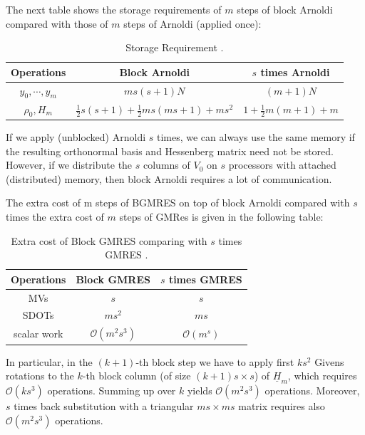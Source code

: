 The next table shows the storage requirements of $m$ steps of block Arnoldi compared with those of $m$ steps of Arnoldi (applied once):

\begin{table}[htbp]
	\renewcommand{\arraystretch}{1.4}
	\small	
	\caption{Storage Requirement \cite{gutknecht2006block}.}
	\label{block-arnoldi-memory}
	\centering
	\begin{tabular}{c|c|c}
		\toprule
		\cellcolor{gray!50}Operations & \cellcolor{gray!50}Block Arnoldi & \cellcolor{gray!50}$s$ times Arnoldi  \\
		\midrule
		$y_0,\cdots,  y_m$ & $ms(s+1)N$ & $(m+1)N$   \\
		\cellcolor{gray!20}$\rho_0,H_m$ & \cellcolor{gray!20}$\frac{1}{2}s(s+1)+\frac{1}{2}ms(ms+1)+ms^2$ & \cellcolor{gray!20}$1+\frac{1}{2}m(m+1)+m$ \\
		\bottomrule
	\end{tabular}
\end{table}

If we apply (unblocked) Arnoldi $s$ times, we can always use the same memory if the resulting orthonormal basis and Hessenberg matrix need not be stored. However, if we distribute the $s$ columns of $V_0$ on $s$ processors with attached (distributed) memory, then block Arnoldi requires a lot of communication.

The extra cost of m steps of BGMRES on top of block Arnoldi compared with $s$ times the extra cost of $m$ steps of GMRes is given in the following table:

\begin{table}[htbp]
	\renewcommand{\arraystretch}{1.4}
	\small	
	\caption{Extra cost of Block GMRES comparing with $s$ times GMRES \cite{gutknecht2006block}.}
	\label{block-gmres-extra}
	\centering
	\begin{tabular}{c|c|c}
		\toprule
		\cellcolor{gray!50}Operations & \cellcolor{gray!50}Block GMRES & \cellcolor{gray!50}$s$ times GMRES  \\
		\midrule
		MVs  & $s$ & $s$ \\
		\cellcolor{gray!20}SDOTs & \cellcolor{gray!20}$ms^2$ & \cellcolor{gray!20}$ms$   \\
		scalar work & $\mathcal{O}(m^2s^3)$ & $\mathcal{O}(m^s)$ \\
		\bottomrule
	\end{tabular}
\end{table}

In particular, in the $(k+1)$-th block step we have to apply first $ks^2$ Givens rotations to the $k$-th block column (of size $(k+1)s\times s$) of $\underline{H}_m$, which requires $\mathcal{O}(ks^3)$ operations. Summing up over $k$ yields $\mathcal{O}(m^2s^3)$ operations. Moreover, $s$ times back substitution with a triangular $ms \times ms$ matrix requires also $\mathcal{O}(m^2s^3)$ operations.

